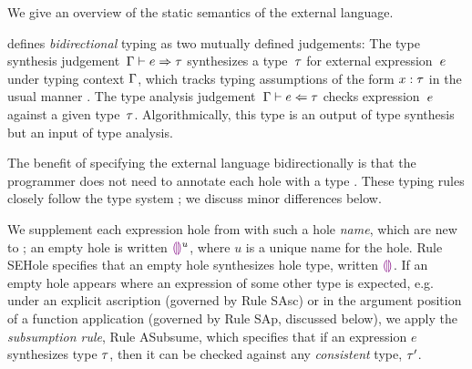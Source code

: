 
%
%
%

%




We give an overview of the static semantics of the \HazelnutLive
external language.

 defines \emph{bidirectional} typing
%
as two mutually defined judgements: The type synthesis
judgement~$\Gamma \vdash e \Rightarrow \tau$ synthesizes a type~$\tau$
for external expression~$e$ under typing context $\Gamma$, which tracks typing
assumptions of the form $x : \tau$ in the usual
manner \cite{pfpl,tapl}.
%
The type analysis judgement~$\Gamma \vdash e \Leftarrow \tau$ checks
expression~$e$ against a given type~$\tau$. Algorithmically, this
type is an output of type synthesis but an input of type analysis.



The benefit of specifying the \HazelnutLive external language
bidirectionally is that the programmer does not need to annotate each
hole with a type
%
\cite{Pierce:2000ve,bidi-tutorial,DBLP:conf/icfp/DunfieldK13,Chlipala:2005da}.
%
These typing rules closely follow the \Hazelnut type
system \cite{popl-paper}; we discuss minor differences below.

We supplement each expression hole from \Hazelnut with such a
hole \emph{name}, which are new to \HazelnutLive; an empty hole is
written $\textcolor{violet}{\llparenthesis}\textcolor{violet}{\rrparenthesis}^{u}$, where $u$ is a unique name for the hole.
%
Rule {SEHole} specifies that an empty hole synthesizes hole type, written $\textcolor{violet}{\llparenthesis}\textcolor{violet}{\rrparenthesis}$.
%
If an empty hole appears where an expression of some other type is
expected, e.g. under an explicit ascription (governed by Rule {SAsc})
or in the argument position of a function application (governed by
Rule {SAp}, discussed below), we apply the \emph{subsumption rule},
Rule {ASubsume}, which specifies that if an expression $e$ synthesizes
type $\tau$, then it can be checked against any \emph{consistent}
type, $\tau'$.

